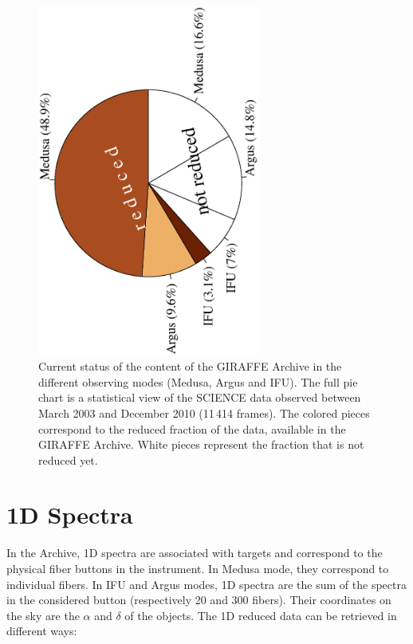 \begin{figure}[!ht]
\begin{center}
    \includegraphics[angle=-90,width=0.65\textwidth]{part6/Royer_P63/P63_f1.eps}
\end{center}
\caption{Current status of the content of the GIRAFFE Archive in the different observing modes (Medusa, Argus and IFU). The full pie chart is a statistical view of the SCIENCE data observed between March 2003 and December 2010 (11\,414 frames). The colored pieces correspond to the reduced fraction of the data, available in the GIRAFFE Archive. White pieces represent the fraction that is not reduced yet.
}
\label{camembert}
\end{figure}


\section{1D Spectra}

In the Archive, 1D spectra are associated with targets and correspond to the physical fiber buttons in the instrument. In Medusa mode, they correspond to individual fibers. In IFU and Argus modes, 1D spectra are the sum of the spectra in the considered button (respectively 20 and 300 fibers). Their coordinates on the sky are the $\alpha$ and $\delta$ of the objects. The 1D reduced data can be retrieved in different ways:
